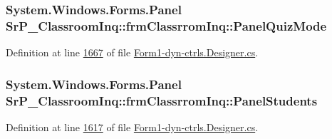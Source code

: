 \hypertarget{class_sr_p___classroom_inq_1_1frm_classrrom_inq_a0dfa3465bc2680dd54dfeacc88b39bee}{
\subsubsection[{\-Panel\-Quiz\-Mode}]{\setlength{\rightskip}{0pt plus 5cm}\-System.\-Windows.\-Forms.\-Panel {\bf \-Sr\-P\-\_\-\-Classroom\-Inq\-::frm\-Classrrom\-Inq\-::\-Panel\-Quiz\-Mode}}}
\label{class_sr_p___classroom_inq_1_1frm_classrrom_inq_a0dfa3465bc2680dd54dfeacc88b39bee}


\-Definition at line \hyperlink{_form1-dyn-ctrls_8_designer_8cs_source_l01667}{1667} of file \hyperlink{_form1-dyn-ctrls_8_designer_8cs_source}{\-Form1-\/dyn-\/ctrls.\-Designer.\-cs}.

\hypertarget{class_sr_p___classroom_inq_1_1frm_classrrom_inq_a70fa7dcce9d5cbc3564066532704c216}{
\subsubsection[{\-Panel\-Students}]{\setlength{\rightskip}{0pt plus 5cm}\-System.\-Windows.\-Forms.\-Panel {\bf \-Sr\-P\-\_\-\-Classroom\-Inq\-::frm\-Classrrom\-Inq\-::\-Panel\-Students}}}
\label{class_sr_p___classroom_inq_1_1frm_classrrom_inq_a70fa7dcce9d5cbc3564066532704c216}


\-Definition at line \hyperlink{_form1-dyn-ctrls_8_designer_8cs_source_l01617}{1617} of file \hyperlink{_form1-dyn-ctrls_8_designer_8cs_source}{\-Form1-\/dyn-\/ctrls.\-Designer.\-cs}.

